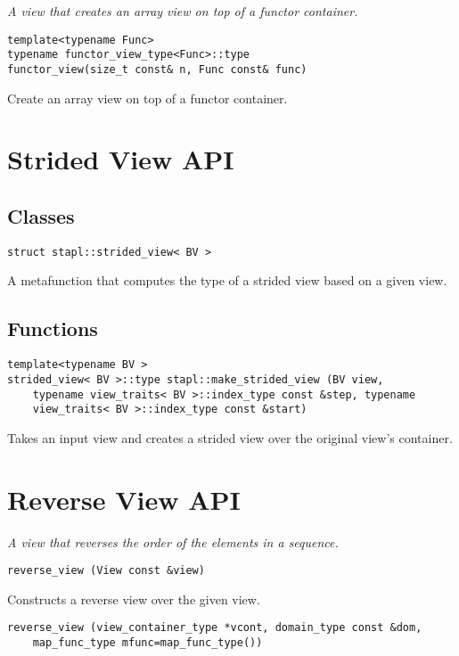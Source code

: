 \emph{ A view that creates an array view on top of a functor container.}

\begin{verbatim}
template<typename Func>
typename functor_view_type<Func>::type
functor_view(size_t const& n, Func const& func)
\end{verbatim}

Create an array view on top of a functor container.

\pagebreak
\section{Strided View API} \label{sec-str-vw}

\subsection{Classes}

\begin{verbatim}
struct stapl::strided_view< BV >
\end{verbatim}

A metafunction that computes the type of a strided view based on a given view.

\subsection{Functions}

\begin{verbatim}
template<typename BV >
strided_view< BV >::type stapl::make_strided_view (BV view,
    typename view_traits< BV >::index_type const &step, typename
    view_traits< BV >::index_type const &start)
\end{verbatim}

Takes an input view and creates a strided view over the original view's container.

\section{Reverse View API } \label{sec-rev-vw}

\emph{ A view that reverses the order of the elements in a sequence.}

\begin{verbatim}
reverse_view (View const &view)
\end{verbatim}

Constructs a reverse view over the given view.

\begin{verbatim}
reverse_view (view_container_type *vcont, domain_type const &dom,
    map_func_type mfunc=map_func_type())
\end{verbatim}

